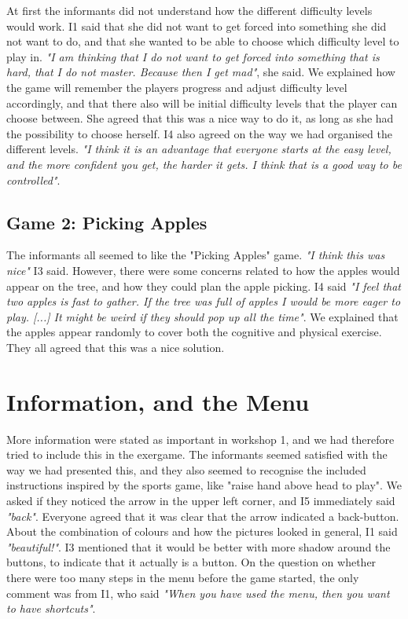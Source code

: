 At first the informants did not understand how the different difficulty levels would work. I1 said that she did not want to get forced into something she did not want to do, and that she wanted to be able to choose which difficulty level to play in. \emph{"I am thinking that I do not want to get forced into something that is hard, that I do not master. Because then I get mad"}, she said. We explained how the game will remember the players progress and adjust difficulty level accordingly, and that there also will be initial difficulty levels that the player can choose between. She agreed that this was a nice way to do it, as long as she had the possibility to choose herself. I4 also agreed on the way we had organised the different levels. \emph{"I think it is an advantage that everyone starts at the easy level, and the more confident you get, the harder it gets. I think that is a good way to be controlled"}.

\subsection{Game 2: Picking Apples}

The informants all seemed to like the "Picking Apples" game. \emph{"I think this was nice"} I3 said. However, there were some concerns related to how the apples would appear on the tree, and how they could plan the apple picking. I4 said \emph{"I feel that two apples is fast to gather. If the tree was full of apples I would be more eager to play. [...] It might be weird if they should pop up all the time"}. We explained that the apples appear randomly to cover both the cognitive and physical exercise. They all agreed that this was a nice solution. 


\section{Information, and the Menu}

More information were stated as important in workshop 1, and we had therefore tried to include this in the exergame. The informants seemed satisfied with the way we had presented this, and they also seemed to recognise the included instructions inspired by the sports game, like "raise hand above head to play". We asked if they noticed the arrow in the upper left corner, and I5 immediately said \emph{"back"}. Everyone agreed that it was clear that the arrow indicated a back-button. About the combination of colours and how the pictures looked in general, I1 said \emph{"beautiful!"}. I3 mentioned that it would be better with more shadow around the buttons, to indicate that it actually is a button. On the question on whether there were too many steps in the menu before the game started, the only comment was from I1, who said \emph{"When you have used the menu, then you want to have shortcuts"}. 

